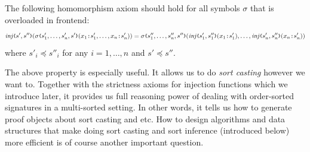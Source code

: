 \documentclass[UTF8,11pt]{article}
\theoremstyle{plain}
\theoremstyle{definition}
\theoremstyle{remark}
\newcommand{\cln}{\texttt{:}}
\newcommand{\parametric}[2]{{#1}\raisebox{.2ex}{\texttt{\footnotesize{\{}}}#2\raisebox{.2ex}{\texttt{\footnotesize{\}}}}}
\newcommand{\inj}[2]{\parametric{\mathit{inj}}{#1, #2}}
\begin{document}
%
The following homomorphism axiom should hold for all symbols $\sigma$ that is 
overloaded in frontend:
$$
\inj{s'}{s''}(
\parametric{\sigma}{s'_1,\dots,s'_n,s'}(x_1 \cln s'_1,\dots,x_n \cln s'_n))
=
\parametric{\sigma}{s''_1,\dots,s''_n,s''}(
  \inj{s'_1}{s''_1}(x_1\cln s'_1), \dots, \inj{s'_n}{s''_n}(x_n\cln s'_n))
$$
where $s'_i \preceq s''_i$ for any $i = 1, \dots, n$ and $s' \preceq s''$.

The above property is especially useful.
It allows us to do \emph{sort casting} however we want to.
Together with the strictness axioms for injection functions which we introduce 
later, it provides us full reasoning power of dealing with order-sorted 
signatures in a multi-sorted setting.
In other words, it tells us how to generate proof objects about sort casting 
and etc. 
How to design algorithms and data structures that make doing sort casting and 
sort inference (introduced below) more efficient is of course another important 
question.
\end{document}
